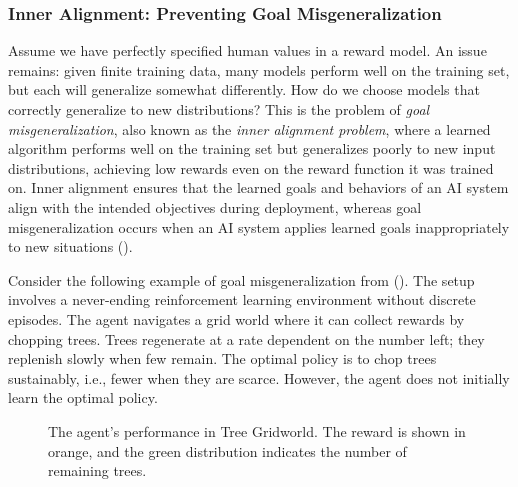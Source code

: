 \documentclass[
  letterpaper,
  numbers=noenddot,
  DIV=11]{scrreprt}
\theoremstyle{definition}
\theoremstyle{plain}
\theoremstyle{plain}
\theoremstyle{remark}
\begin{document}
\subsubsection{Inner Alignment: Preventing Goal
Misgeneralization}\label{inner-alignment-preventing-goal-misgeneralization}

Assume we have perfectly specified human values in a reward model. An
issue remains: given finite training data, many models perform well on
the training set, but each will generalize somewhat differently. How do
we choose models that correctly generalize to new distributions? This is
the problem of \emph{goal misgeneralization}, also known as the
\emph{inner alignment problem}, where a learned algorithm performs well
on the training set but generalizes poorly to new input distributions,
achieving low rewards even on the reward function it was trained on.
Inner alignment ensures that the learned goals and behaviors of an AI
system align with the intended objectives during deployment, whereas
goal misgeneralization occurs when an AI system applies learned goals
inappropriately to new situations
().

Consider the following example of goal misgeneralization from
(). The setup involves a
never-ending reinforcement learning environment without discrete
episodes. The agent navigates a grid world where it can collect rewards
by chopping trees. Trees regenerate at a rate dependent on the number
left; they replenish slowly when few remain. The optimal policy is to
chop trees sustainably, i.e., fewer when they are scarce. However, the
agent does not initially learn the optimal policy.

\begin{figure}


\caption{\label{fig-enter-label-1}The agent's performance in Tree
Gridworld. The reward is shown in orange, and the green distribution
indicates the number of remaining trees.}

\end{figure}%
\end{document}
